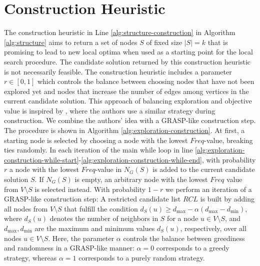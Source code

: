 \documentclass[draft,final]{vutinfth} %
\begin{document}
\section{Construction Heuristic}\label{sec:construction-heuristic}

The construction heuristic in Line \ref{alg:structure-construction} in Algorithm \ref{alg:structure} aims to return a set of nodes $S$ of fixed size $|S| = k$ that is promising to lead to new local optima when used as a starting point for the local search procedure. The candidate solution returned by this construction heuristic is not necessarily feasible. 
The construction heuristic includes a parameter $r \in [0,1]$ which controls the balance between choosing nodes that have not been explored yet and nodes that increase the number of edges among vertices in the current candidate solution. This approach of balancing exploration and objective value is inspired by \cite{chen_nuqclq_2021}, where the authors use a similar strategy during construction. We combine the authors' idea with a GRASP-like construction step. The procedure is shown in Algorithm \ref{alg:exploration-construction}. 
At first, a starting node is selected by choosing a node with the lowest $Freq$-value, breaking ties randomly. In each iteration of the main while loop in line \ref{alg:exploration-construction-while-start}-\ref{alg:exploration-construction-while-end}, with probability $r$ a node with the lowest $Freq$-value in $N_G(S)$ is added to the current candidate solution $S$. If $N_G(S)$ is empty, an arbitrary node with the lowest $Freq$ value from $V\setminus S$ is selected instead. 
With probability $1-r$ we perform an iteration of a GRASP-like construction step: A restricted candidate list $\mathit{RCL}$ is built by adding all nodes from $V \setminus S$ that fulfill the condition $d_S(u) \geq d_{\max} - \alpha(d_{\max} - d_{\min})$, where $d_S(u)$ denotes the number of neighbors in $S$ for a node $u \in V \setminus S$, and $d_{\max}, d_{\min}$ are the maximum and minimum values $d_S(u)$, respectively, over all nodes $u\in V \setminus S$. Here, the parameter $\alpha$ controls the balance between greediness and randomness in a GRASP-like manner: $\alpha=0$ corresponds to a greedy strategy, whereas $\alpha=1$ corresponds to a purely random strategy.  
\end{document}
